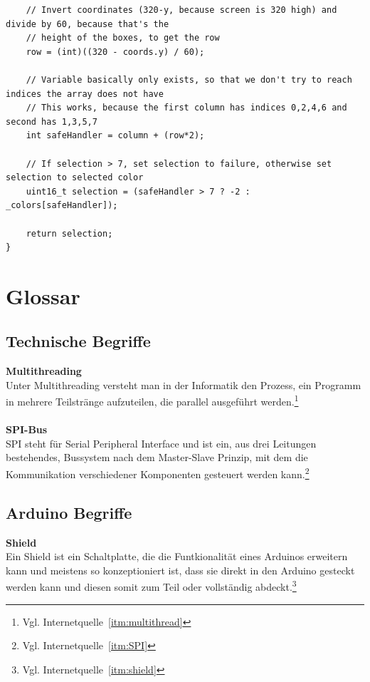 \documentclass[a4paper, 11pt]{scrartcl}
\begin{document}
\begin{small}
\begin{lstlisting}
    // Invert coordinates (320-y, because screen is 320 high) and divide by 60, because that's the 
    // height of the boxes, to get the row
    row = (int)((320 - coords.y) / 60);

    // Variable basically only exists, so that we don't try to reach indices the array does not have
    // This works, because the first column has indices 0,2,4,6 and second has 1,3,5,7
    int safeHandler = column + (row*2);

    // If selection > 7, set selection to failure, otherwise set selection to selected color
    uint16_t selection = (safeHandler > 7 ? -2 : _colors[safeHandler]);

    return selection;
}
\end{lstlisting}











\end{small}
\newpage
\section{Glossar}
\subsection{Technische Begriffe}
\textbf{Multithreading\label{def:multithreading}}
\\
Unter Multithreading versteht man in der Informatik den Prozess, ein Programm in mehrere Teilstränge aufzuteilen, die parallel 
ausgeführt werden.\footnote{Vgl. Internetquelle~\ref{itm:multithread}}
\\
\\
\textbf{SPI-Bus\label{def:SPI}}
\\
SPI steht für Serial Peripheral Interface und ist ein, aus drei Leitungen bestehendes, Bussystem nach dem Master-Slave Prinzip, mit dem die Kommunikation
verschiedener Komponenten gesteuert werden kann.\footnote{Vgl. Internetquelle~\ref{itm:SPI}}
\subsection{Arduino Begriffe}
\textbf{Shield\label{def:shield}}
\\
Ein Shield ist ein Schaltplatte, die die Funtkionalität eines Arduinos erweitern kann und meistens so konzeptioniert ist, dass sie direkt in den Arduino gesteckt werden kann und diesen somit
zum Teil oder vollständig abdeckt.\footnote{Vgl. Internetquelle~\ref{itm:shield}}
\newpage
\end{document}
